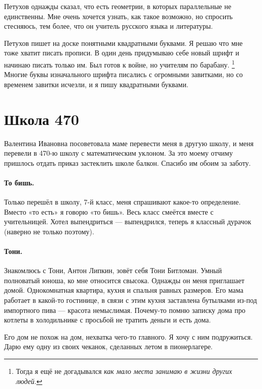 \documentclass{book}
\begin{document}
Петухов однажды сказал, что есть геометрии, в которых параллельные не единственны.
Мне очень хочется узнать, как такое возможно, но спросить стесняюсь, тем более, что он учитель русского языка и литературы.

Петухов пишет на доске понятными квадратными буквами.
Я решаю что мне тоже хватит писать прописи.
В один день придумываю себе новый шрифт и начинаю писать только им.
Был готов к войне, но учителям по барабану.%
\footnote{Тогда я ещё не догадывался \textit{как мало места занимаю в жизни других людей}.}
Многие буквы изначального шрифта писались с огромными завитками, но со временем завитки исчезли, и я пишу квадратными буквами.



\section*{Школа 470}

Валентина Ивановна посоветовала маме перевести меня в другую школу, и
меня перевели в 470-ю школу с математическим уклоном.
За это моему отчиму пришлось отдать приказ застеклить школе балкон.
Спасибо им обоим за заботу.

\paragraph{То бишь.}
Только перешёл в школу, 7-й класс, 
меня спрашивают какое-то определение.
Вместо «то есть» я говорю «то бишь». 
Весь класс смеётся вместе с учительницей.
Хотел выпендриться --- выпендрился, теперь я классный дурачок (наверно не только поэтому).

\paragraph{Тони.} 
Знакомлюсь с Тони, Антон Липкин, зовёт себя Тони Битломан.
Умный полноватый юноша, ко мне относится свысока.
Однажды он меня приглашает домой.
Однокомнатная квартира, кухня и спальня равных размеров.
Его мама работает в какой-то гостинице, в связи с этим кухня заставлена бутылками из-под импортного пива --- красота немыслимая.
Почему-то помню записку дома про котлеты в холодильнике с просьбой не тратить деньги и есть дома.

Его дом не похож на дом, нехватка чего-то главного.
Я хочу с ним подружиться.
Дарю ему одну из своих чеканок,
сделанных летом в пионерлагере.
\end{document}
